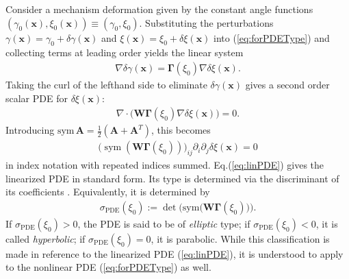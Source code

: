 \documentclass[aps,11pt,tightenlines,notitlepage,superscriptaddress,longbibliography,nofootinbib]{revtex4-1}
\DeclareMathOperator{\sym}{sym}
\begin{document}
Consider a mechanism deformation given by the constant angle functions $(\gamma_0(\mathbf{x}),\xi_0(\mathbf{x}))\equiv(\gamma_0,\xi_0)$. Substituting the perturbations $\gamma(\mathbf{x}) =  \gamma_0 + \delta \gamma(\mathbf{x})$ and $\xi(\mathbf{x}) = \xi_0 + \delta \xi(\mathbf{x})$ into (\ref{eq:forPDEType}) and collecting terms at leading order yields the linear system
\begin{equation}
    \begin{aligned}
    \nabla \delta \gamma(\mathbf{x}) = \boldsymbol{\Gamma}(\xi_0) \nabla \delta \xi(\mathbf{x}).
    \end{aligned}
\end{equation}
Taking the curl of the lefthand side to eliminate $\delta\gamma(\mathbf{x})$ gives a second order scalar PDE for $\delta\xi(\mathbf{x})$:
\begin{equation}
    \begin{aligned}\label{eq:linearPDESupp}
    \nabla \cdot \Big( \mathbf{W} \boldsymbol{\Gamma}(\xi_0) \nabla \delta \xi(\mathbf{x})\Big)= 0.
    \end{aligned}
\end{equation}
Introducing  $\text{sym}\, \mathbf{A} = \frac{1}{2}(\mathbf{A} + \mathbf{A}^T)$, this becomes 
\begin{equation}
    \begin{aligned}\label{eq:linPDE}
    \big(\sym (\mathbf{W}\boldsymbol{\Gamma}(\xi_0))\big)_{ij} \partial_i \partial_j \delta \xi(\mathbf{x}) = 0
    \end{aligned}
\end{equation}
in index notation with repeated indices summed. Eq.\;(\ref{eq:linPDE}) gives the linearized PDE in standard form. 
Its type is determined via the discriminant of its coefficients \cite{courant2008methods}. Equivalently, it is determined by 
\begin{equation}
    \begin{aligned}\label{eq:sigmaPDE}
    \sigma_{\text{PDE}}(\xi_0) := \det\Big( \text{sym} \big( \mathbf{W} \boldsymbol{\Gamma}(\xi_0)\big)\Big).
    \end{aligned}
\end{equation}
If $\sigma_{\text{PDE}}(\xi_0) >0$, the PDE is said to be of \textit{elliptic} type; if $\sigma_{\text{PDE}}(\xi_0) <0$, it is called \textit{hyperbolic};  if $\sigma_{\text{PDE}}(\xi_0) =0$, it is parabolic. While this classification is made in reference to the linearized PDE (\ref{eq:linPDE}), it is understood to apply to the nonlinear PDE (\ref{eq:forPDEType}) as well.
\end{document}
